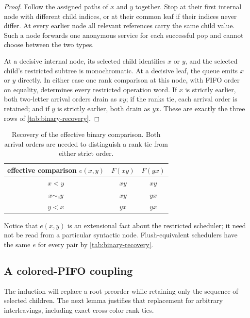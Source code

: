 \begin{proof}
Follow the assigned paths of \(x\) and \(y\) together.  Stop at their first
internal node with different child indices, or at their common leaf if their
indices never differ.  At every earlier node all relevant references carry the
same child value.  Such a node forwards one anonymous service for each
successful pop and cannot choose between the two types.

At a decisive internal node, its selected child identifies \(x\) or \(y\), and
the selected child's restricted subtree is monochromatic.  At a decisive leaf,
the queue emits \(x\) or \(y\) directly.  In either case one rank comparison at
this node, with FIFO order on equality, determines every restricted operation
word.  If \(x\) is strictly earlier, both two-letter arrival orders drain as
\(xy\); if the ranks tie, each arrival order is retained; and if \(y\) is
strictly earlier, both drain as \(yx\).  These are exactly the three rows of
\autoref{tab:binary-recovery}.
\end{proof}

\begin{table}[H]
\centering
\begin{tabular}{@{}c@{\qquad}cc@{}}
\toprule
effective comparison \(e(x,y)\) & \(F(xy)\) & \(F(yx)\)\\
\midrule
\(x<y\) & \(xy\) & \(xy\)\\
\(x\sim_e y\) & \(xy\) & \(yx\)\\
\(y<x\) & \(yx\) & \(yx\)\\
\bottomrule
\end{tabular}
\caption{Recovery of the effective binary comparison.  Both arrival orders are
needed to distinguish a rank tie from either strict order.}
\label{tab:binary-recovery}
\end{table}

Notice that \(e(x,y)\) is an extensional fact about the restricted scheduler;
it need not be read from a particular syntactic node.  Flush-equivalent
schedulers have the same \(e\) for every pair by
\autoref{tab:binary-recovery}.

\subsection{A colored-PIFO coupling}

The induction will replace a root preorder while retaining only the sequence
of selected children.  The next lemma justifies that replacement for arbitrary
interleavings, including exact cross-color rank ties.

